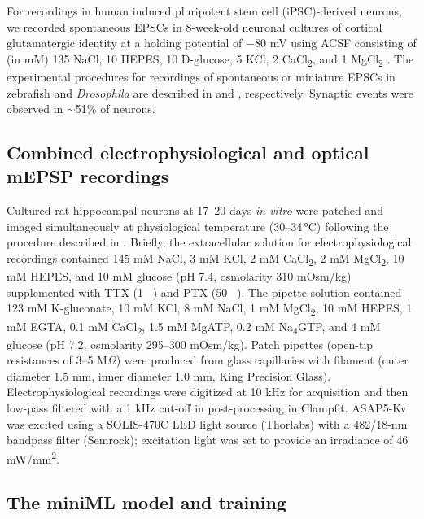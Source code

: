 \documentclass[9pt,lineno]{article}
\begin{document}
For recordings in human induced pluripotent stem cell (iPSC)-derived neurons, we recorded spontaneous EPSCs in 8-week-old neuronal cultures of cortical glutamatergic identity at a holding potential of $-80$ mV using ACSF consisting of (in mM) 135 NaCl, 10 HEPES, 10 D-glucose, 5 KCl, 2 CaCl\textsubscript{2}, and 1 MgCl\textsubscript{2} \citep{Asadollahi2023}. The experimental procedures for recordings of spontaneous or miniature EPSCs in zebrafish and \textit{Drosophila} are described in \citet{RupprechtFriedrich2018} and \citet{BaccinoCalace2022}, respectively. Synaptic events were observed in $\sim$51\% of neurons.

\subsection{Combined electrophysiological and optical mEPSP recordings}

Cultured rat hippocampal neurons at 17--20 days \textit{in vitro} were patched and imaged simultaneously at physiological temperature (30--34\,\si{\celsius}) following the procedure described in \citet{Hao2024}. Briefly, the extracellular solution for electrophysiological recordings contained 145 mM NaCl, 3 mM KCl, 2 mM CaCl\textsubscript{2}, 2 mM MgCl\textsubscript{2}, 10 mM HEPES, and 10 mM glucose (pH 7.4, osmolarity 310 mOsm/kg) supplemented with TTX (1 \si{\micro\Molar}) and PTX (50 \si{\micro\Molar}). The pipette solution contained 123 mM K-gluconate, 10 mM KCl, 8 mM NaCl, 1 mM MgCl\textsubscript{2}, 10 mM HEPES, 1 mM EGTA, 0.1 mM CaCl\textsubscript{2}, 1.5 mM MgATP, 0.2 mM Na\textsubscript{4}GTP, and 4 mM glucose (pH 7.2, osmolarity 295--300 mOsm/kg). Patch pipettes (open-tip resistances of 3--5 M$\Omega$) were produced from glass capillaries with filament (outer diameter 1.5 mm, inner diameter 1.0 mm, King Precision Glass). Electrophysiological recordings were digitized at 10 kHz for acquisition and then low-pass filtered with a 1 kHz cut-off in post-processing in Clampfit. ASAP5-Kv was excited using a SOLIS-470C LED light source (Thorlabs) with a 482/18-nm bandpass filter (Semrock); excitation light was set to provide an irradiance of 46 mW/mm\textsuperscript{2}.

\subsection{The miniML model and training}
\end{document}

